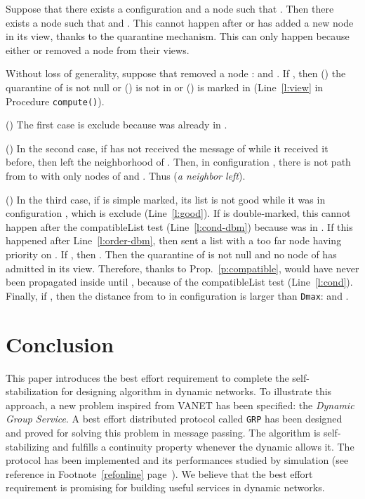 \documentclass[11pt,english]{article}
\newenvironment{proof}[1][0cm]{
  \begin{list}{\bf Proof.~}{
      \setlength{\itemindent}{0cm}
      \setlength{\labelsep}{0cm}
      \setlength{\labelwidth}{#1}
      \setlength{\leftmargin}{#1}
    \item
    }
}{\hfill
  \end{list}
}
\begin{document}
\begin{proof}
  Suppose that there exists a configuration  and a node  such that
  . Then there
  exists a node  such that  and .
This cannot happen after  or  has added a new node in its view, thanks
  to the quarantine mechanism. This can only happen because either  or 
  removed a node from their views.

  Without loss of generality, suppose that  removed a node :  and .
If , then () the quarantine of  is
  not null or ()  is not in  or ()  is
  marked in  (Line~\ref{l:view} in Procedure
  \texttt{compute()}).

\noindent 
  () The first case is exclude because  was already in
  .

\noindent 
  () In the second case, if  has not received the message of  while it
  received it before, then  left the neighborhood of .
  Then, in configuration , there is not path from  to
   with only nodes of  and . Thus  (\emph{a neighbor left}).

\noindent 
  () In the third case, if  is simple marked, its list is not good while
  it was in configuration , which is exclude (Line~\ref{l:good}). If  is
  double-marked, this cannot happen after the compatibleList test
  (Line~\ref{l:cond-dbm}) because  was in . If this
  happened after Line~\ref{l:order-dbm}, then  sent a list with a too far
  node  having priority on . If , then . Then the quarantine of  is not null and no node
  of  has admitted  in its view. Therefore, thanks to
  Prop.~\ref{p:compatible},  would have never been propagated inside
   until , because of the compatibleList test
  (Line~\ref{l:cond}). Finally, if , then the distance
  from  to  in configuration  is larger than \texttt{Dmax}:
   and . \end{proof}



\section{Conclusion}
\label{s:conclu}



This paper introduces the best effort requirement to complete the
self-stabilization for designing algorithm in dynamic networks.
To illustrate this approach, a new problem inspired from VANET has been
specified: the \emph{Dynamic Group Service}.  A best effort distributed protocol
called \texttt{GRP} has been designed and proved for solving this problem in
message passing. The algorithm is self-stabilizing and fulfills a continuity
property whenever the dynamic allows it.
The protocol has been implemented and its performances studied by simulation
(see reference in Footnote~\ref{refonline} page~\pageref{refonline}). We believe
that the best effort requirement is promising for building useful services in
dynamic networks.
\end{document}

